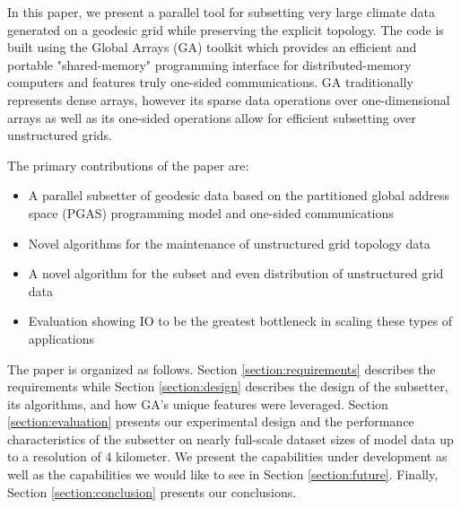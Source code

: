 In this paper, we present a parallel tool for subsetting very large climate
data generated on a geodesic grid while preserving the explicit topology.  The
code is built using the Global Arrays (GA) toolkit\cite{GA} which provides an
efficient and portable "shared-memory" programming interface for
distributed-memory computers and features truly one-sided communications.  GA
traditionally represents dense arrays, however its sparse data operations over
one-dimensional arrays as well as its one-sided operations allow for efficient
subsetting over unstructured grids.

The primary contributions of the paper are:
\begin{itemize}
\item A parallel subsetter of geodesic data based on the partitioned global
address space (PGAS) programming model and one-sided communications
\item Novel algorithms for the maintenance of unstructured grid topology data
\item A novel algorithm for the subset and even distribution of unstructured grid data
\item Evaluation showing IO to be the greatest bottleneck in scaling these types of applications
\end{itemize}

The paper is organized as follows.  Section \ref{section:requirements}
describes the requirements while Section \ref{section:design} describes the
design of the subsetter, its algorithms, and how GA's unique features were
leveraged.  Section \ref{section:evaluation} presents our experimental design
and the performance characteristics of the subsetter on nearly full-scale
dataset sizes of model data up to a resolution of 4 kilometer.  We present the
capabilities under development as well as the capabilities we would like to
see in Section \ref{section:future}.  Finally, Section
\ref{section:conclusion} presents our conclusions.
